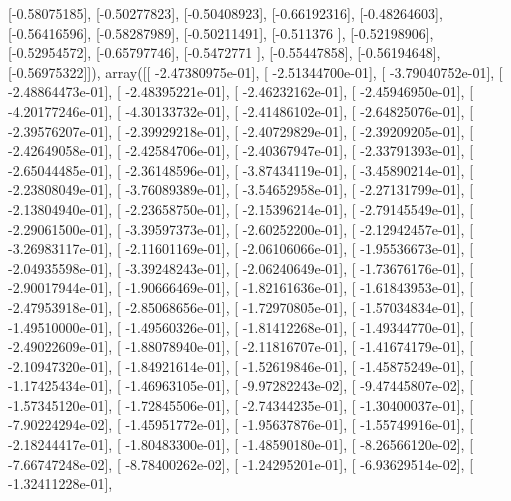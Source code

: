 \documentclass{article}
\begin{document}
       [-0.58075185],
       [-0.50277823],
       [-0.50408923],
       [-0.66192316],
       [-0.48264603],
       [-0.56416596],
       [-0.58287989],
       [-0.50211491],
       [-0.511376  ],
       [-0.52198906],
       [-0.52954572],
       [-0.65797746],
       [-0.5472771 ],
       [-0.55447858],
       [-0.56194648],
       [-0.56975322]]), array([[ -2.47380975e-01],
       [ -2.51344700e-01],
       [ -3.79040752e-01],
       [ -2.48864473e-01],
       [ -2.48395221e-01],
       [ -2.46232162e-01],
       [ -2.45946950e-01],
       [ -4.20177246e-01],
       [ -4.30133732e-01],
       [ -2.41486102e-01],
       [ -2.64825076e-01],
       [ -2.39576207e-01],
       [ -2.39929218e-01],
       [ -2.40729829e-01],
       [ -2.39209205e-01],
       [ -2.42649058e-01],
       [ -2.42584706e-01],
       [ -2.40367947e-01],
       [ -2.33791393e-01],
       [ -2.65044485e-01],
       [ -2.36148596e-01],
       [ -3.87434119e-01],
       [ -3.45890214e-01],
       [ -2.23808049e-01],
       [ -3.76089389e-01],
       [ -3.54652958e-01],
       [ -2.27131799e-01],
       [ -2.13804940e-01],
       [ -2.23658750e-01],
       [ -2.15396214e-01],
       [ -2.79145549e-01],
       [ -2.29061500e-01],
       [ -3.39597373e-01],
       [ -2.60252200e-01],
       [ -2.12942457e-01],
       [ -3.26983117e-01],
       [ -2.11601169e-01],
       [ -2.06106066e-01],
       [ -1.95536673e-01],
       [ -2.04935598e-01],
       [ -3.39248243e-01],
       [ -2.06240649e-01],
       [ -1.73676176e-01],
       [ -2.90017944e-01],
       [ -1.90666469e-01],
       [ -1.82161636e-01],
       [ -1.61843953e-01],
       [ -2.47953918e-01],
       [ -2.85068656e-01],
       [ -1.72970805e-01],
       [ -1.57034834e-01],
       [ -1.49510000e-01],
       [ -1.49560326e-01],
       [ -1.81412268e-01],
       [ -1.49344770e-01],
       [ -2.49022609e-01],
       [ -1.88078940e-01],
       [ -2.11816707e-01],
       [ -1.41674179e-01],
       [ -2.10947320e-01],
       [ -1.84921614e-01],
       [ -1.52619846e-01],
       [ -1.45875249e-01],
       [ -1.17425434e-01],
       [ -1.46963105e-01],
       [ -9.97282243e-02],
       [ -9.47445807e-02],
       [ -1.57345120e-01],
       [ -1.72845506e-01],
       [ -2.74344235e-01],
       [ -1.30400037e-01],
       [ -7.90224294e-02],
       [ -1.45951772e-01],
       [ -1.95637876e-01],
       [ -1.55749916e-01],
       [ -2.18244417e-01],
       [ -1.80483300e-01],
       [ -1.48590180e-01],
       [ -8.26566120e-02],
       [ -7.66747248e-02],
       [ -8.78400262e-02],
       [ -1.24295201e-01],
       [ -6.93629514e-02],
       [ -1.32411228e-01],
\end{document}
